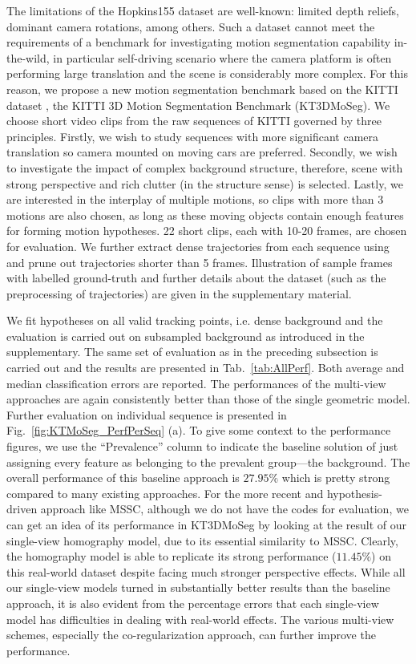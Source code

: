 \documentclass[10pt,twocolumn,letterpaper]{article}
\begin{document}
The limitations of the Hopkins155 dataset are well-known: limited depth reliefs, dominant camera rotations, among others. 
Such a dataset cannot meet the requirements of a benchmark for investigating motion segmentation capability in-the-wild, in particular self-driving scenario where the camera platform is often performing large translation and the scene is considerably more complex. For this reason, we propose a new motion segmentation benchmark based on the KITTI dataset \cite{Geiger2013IJRR}, the KITTI 3D Motion Segmentation Benchmark (KT3DMoSeg). We choose short video clips from the raw sequences of KITTI governed by three principles. Firstly, we wish to study sequences with more significant camera translation so camera mounted on moving cars are preferred. Secondly, we wish to investigate the impact of complex background structure, therefore, scene with strong perspective and rich clutter (in the structure sense) is selected. Lastly, we are interested in the interplay of multiple motions, so clips with more than 3 motions are also chosen, as long as these moving objects contain enough features for forming motion hypotheses. 22 short clips, each with 10-20 frames, are chosen for evaluation. We further extract dense trajectories from each sequence using \cite{Sundaram2010} and prune out trajectories shorter than 5 frames. Illustration of sample frames with labelled ground-truth and further details about the dataset (such as the preprocessing of trajectories) are given in the supplementary material.

We fit hypotheses on all valid tracking points, i.e. dense background and the evaluation is carried out on subsampled background as introduced in the supplementary. The same set of evaluation as in the preceding subsection is carried out and the results are presented in Tab.~\ref{tab:AllPerf}.  Both average and median classification errors are reported. The performances of the multi-view approaches are again consistently better than those of the single geometric model. Further evaluation on individual sequence is presented in Fig.~\ref{fig:KTMoSeg_PerfPerSeq} (a). To give some context to the performance figures, we use the ``Prevalence'' column to indicate the baseline solution of just assigning every feature as belonging to the prevalent group---the background. The overall performance of this baseline approach is $27.95\%$ which is pretty strong compared to many existing approaches. For the more recent and hypothesis-driven approach like MSSC, although we do not have the codes for evaluation, we can get an idea of its performance in KT3DMoSeg by looking at the result of our single-view homography model, due to its essential similarity to MSSC. Clearly, the homography model is able to replicate its strong performance ($11.45\%$) on this real-world dataset despite facing much stronger perspective effects. While all our single-view models turned in substantially better results than the baseline approach, it is also evident from the percentage errors that each single-view model has difficulties in dealing with real-world effects. The various multi-view schemes, especially the co-regularization approach, can further improve the performance.
\end{document}
